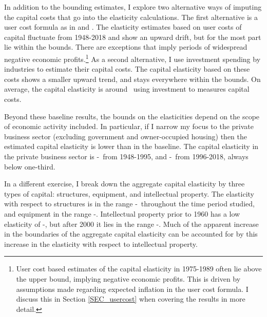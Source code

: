 \documentclass[11pt]{article}
\begin{document}
In addition to the bounding estimates, I explore two alternative ways of imputing the capital costs that go into the elasticity calculations. The first alternative is a user cost formula \citep{halljorg1967} as in \cite{Barkai000} and \cite{rognlie2015}. The elasticity estimates based on user costs of capital fluctuate from 1948-2018 and show an upward drift, but for the most part lie within the bounds. There are exceptions that imply periods of widespread negative economic profits.\footnote{User cost based estimates of the capital elasticity in 1975-1989 often lie above the upper bound, implying negative economic profits. This is driven by assumptions made regarding expected inflation in the user cost formula. I discuss this in Section \ref{SEC_usercost} when covering the results in more detail.} As a second alternative, I use investment spending by industries to estimate their capital costs. The capital elasticity based on these costs shows a smaller upward trend, and stays everywhere within the bounds. On average, the capital elasticity is around \baseinv \ using investment to measures capital costs.

Beyond these baseline results, the bounds on the elasticities depend on the scope of economic activity included. In particular, if I narrow my focus to the private business sector (excluding government and owner-occupied housing) then the estimated capital elasticity is lower than in the baseline. The capital elasticity in the private business sector is \nohsearlydepr-\nohsearlynoprofit \ from 1948-1995, and \nohslatedepr-\nohslatenoprofit \ from 1996-2018, always below one-third. 

In a different exercise, I break down the aggregate capital elasticity by three types of capital: structures, equipment, and intellectual property. The elasticity with respect to structures is in the range \basestdepr-\basetnoprofit \ throughout the time period studied, and equipment in the range \baseeqdepr-\baseeqnoprofit. Intellectual property prior to 1960 has a low elasticity of \baseipearlydepr-\baseipearlynoprofit, but after 2000 it lies in the range \baseiplatedepr-\baseiplatenoprofit. Much of the apparent increase in the boundaries of the aggregate capital elasticity can be accounted for by this increase in the elasticity with respect to intellectual property.
\end{document}
